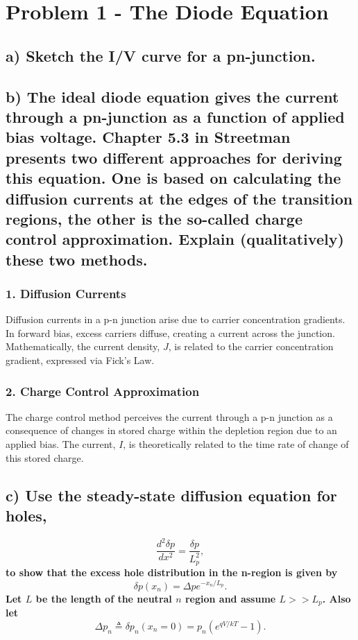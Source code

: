 \section{Problem 1 - The Diode Equation}
\subsection*{a) Sketch the I/V curve for a pn-junction.}


\subsection*{b) The ideal diode equation gives the current through a pn-junction as a function of applied bias voltage. Chapter 5.3 in Streetman presents two different approaches for deriving this equation. One is based on calculating the diffusion currents at the edges of the transition regions, the other is the so-called charge control approximation. Explain (qualitatively) these two methods.}

\subsubsection*{1. Diffusion Currents}
Diffusion currents in a p-n junction arise due to carrier concentration gradients. In forward bias, excess carriers diffuse, creating a current across the junction. Mathematically, the current density, \( J \), is related to the carrier concentration gradient, expressed via Fick's Law.

\subsubsection*{2. Charge Control Approximation}
The charge control method perceives the current through a p-n junction as a consequence of changes in stored charge within the depletion region due to an applied bias. The current, \( I \), is theoretically related to the time rate of change of this stored charge.


\subsection*{c) Use the steady-state diffusion equation for holes, }
\textbf{$$ \frac{d^2 \delta p}{d x^2}=\frac{\delta p}{L_p^2}, $$ to show that the excess hole distribution in the n-region is given by $$ \delta p\left(x_n\right)=\Delta p e^{-x_n / L_p} . $$ Let $L$ be the length of the neutral $n$ region and assume $L>>L_p$. Also let $$ \Delta p_n \triangleq \delta p_n\left(x_n=0\right)=p_n\left(e^{q V / k T}-1\right) . $$}

